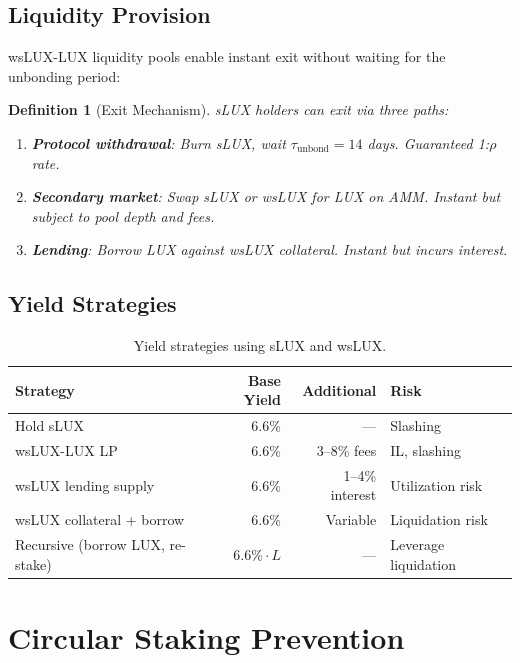 \documentclass[11pt,a4paper]{article}
\newtheorem{definition}{Definition}
\begin{document}
\subsection{Liquidity Provision}

wsLUX-LUX liquidity pools enable instant exit without waiting for the unbonding period:

\begin{definition}[Exit Mechanism]
sLUX holders can exit via three paths:
\begin{enumerate}
    \item \textbf{Protocol withdrawal}: Burn sLUX, wait $\tau_{\text{unbond}} = 14$ days. Guaranteed 1:$\rho$ rate.
    \item \textbf{Secondary market}: Swap sLUX or wsLUX for LUX on AMM. Instant but subject to pool depth and fees.
    \item \textbf{Lending}: Borrow LUX against wsLUX collateral. Instant but incurs interest.
\end{enumerate}
\end{definition}

\subsection{Yield Strategies}

\begin{table}[H]
\centering
\caption{Yield strategies using sLUX and wsLUX.}
\label{tab:strategies}
\begin{tabular}{p{4cm}rrp{4cm}}
\toprule
\textbf{Strategy} & \textbf{Base Yield} & \textbf{Additional} & \textbf{Risk} \\
\midrule
Hold sLUX & 6.6\% & --- & Slashing \\
wsLUX-LUX LP & 6.6\% & 3--8\% fees & IL, slashing \\
wsLUX lending supply & 6.6\% & 1--4\% interest & Utilization risk \\
wsLUX collateral + borrow & 6.6\% & Variable & Liquidation risk \\
Recursive (borrow LUX, re-stake) & $6.6\% \cdot L$ & --- & Leverage liquidation \\
\bottomrule
\end{tabular}
\end{table}

\section{Circular Staking Prevention}\label{sec:circular}
\end{document}
